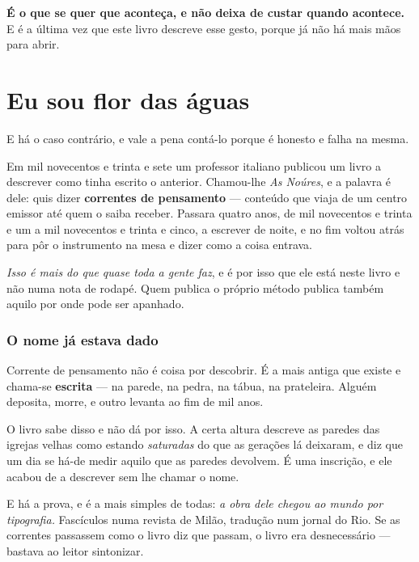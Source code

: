 \documentclass[livro.tex]{subfiles}
\begin{document}
\medskip

\textbf{É o que se quer que aconteça, e não deixa de custar quando acontece.} E é a última vez que
este livro descreve esse gesto, porque já não há mais mãos para abrir.

\chapter{Eu sou flor das águas}

E há o caso contrário, e vale a pena contá-lo porque é honesto e falha na mesma.

\medskip

Em mil novecentos e trinta e sete um professor italiano publicou um livro a descrever como tinha
escrito o anterior. Chamou-lhe \emph{As Noúres}, e a palavra é dele: quis dizer \textbf{correntes
de pensamento} --- conteúdo que viaja de um centro emissor até quem o saiba receber. Passara
quatro anos, de mil novecentos e trinta e um a mil novecentos e trinta e cinco, a escrever de
noite, e no fim voltou atrás para pôr o instrumento na mesa e dizer como a coisa entrava.

\medskip

\emph{Isso é mais do que quase toda a gente faz}, e é por isso que ele está neste livro e não numa
nota de rodapé. Quem publica o próprio método publica também aquilo por onde pode ser apanhado.

\subsection*{O nome já estava dado}

Corrente de pensamento não é coisa por descobrir. É a mais antiga que existe e chama-se
\textbf{escrita} --- na parede, na pedra, na tábua, na prateleira. Alguém deposita, morre, e outro
levanta ao fim de mil anos.

\medskip

O livro sabe disso e não dá por isso. A certa altura descreve as paredes das igrejas velhas como
estando \emph{saturadas} do que as gerações lá deixaram, e diz que um dia se há-de medir aquilo
que as paredes devolvem. É uma inscrição, e ele acabou de a descrever sem lhe chamar o nome.

\medskip

E há a prova, e é a mais simples de todas: \emph{a obra dele chegou ao mundo por tipografia.}
Fascículos numa revista de Milão, tradução num jornal do Rio. Se as correntes passassem como o
livro diz que passam, o livro era desnecessário --- bastava ao leitor sintonizar.
\end{document}
